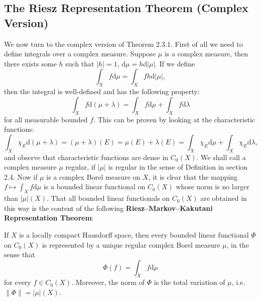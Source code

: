 \subsection{The Riesz Representation Theorem (Complex Version)}
We now turn to the complex version of Theorem 2.3.1. First of all we need to define integrals over a complex measure. Suppose $\mu$ is a complex measure, then there exists some $h$ such that $|h|=1$, $\mathrm{d}\mu=h\mathrm{d}|\mu|$. If we define 
$$
\int_X{f\mathrm{d}\mu}=\int_X{fh\mathrm{d}\left| \mu \right|},
$$
then the integral is well-defined and has the following property: 
$$
\int_X{f\mathrm{d}\left( \mu +\lambda \right)}=\int_X{f\mathrm{d}\mu}+\int_X{f\mathrm{d}\lambda}
$$
for all measurable bounded $f$. This can be proven by looking at the characteristic functions: 
$$
\int_X{\chi _E\mathrm{d}\left( \mu +\lambda \right)}=\left( \mu +\lambda \right) \left( E \right) =\mu \left( E \right) +\lambda \left( E \right) =\int_X{\chi _E\mathrm{d}\mu}+\int_X{\chi _E\mathrm{d}\lambda},
$$
and observe that characteristic functions are dense in $C_0(X)$. We shall call a complex measure $\mu$ regular, if $|\mu|$ is regular in the sense of Definition in section 2.4. Now if $\mu$ is a complex Borel measure on $X$, it is clear that the mapping $f\mapsto\int_Xf\mathrm{d}\mu$ is a bounded linear functional on $C_0(X)$ whose norm is no larger than $|\mu|(X)$. That all bounded linear functionals on $C_0(X)$ are obtained in this way is the content of the following \textbf{Riesz–Markov–Kakutani Representation Theorem}:
\begin{theorem}
If $X$ is a locally compact Hausdorff space, then every bounded linear functional $\Phi$ on $C_0(X)$ is represented by a unique regular complex Borel measure $\mu$, in the sense that 
$$\Phi(f)=\int_Xf\mathrm{d}\mu$$
for every $f\in C_0(X)$. Moreover, the norm of $\Phi$ is the total variation of $\mu$, i.e. $\|\Phi\|=|\mu|(X)$.
\end{theorem}
